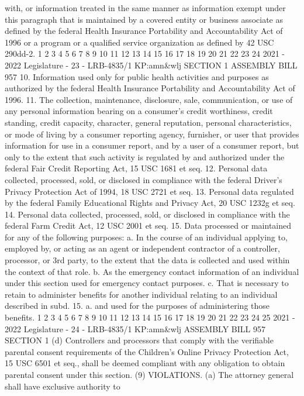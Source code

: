 with, or information treated in the same manner as information exempt under this
paragraph that is maintained by a covered entity or business associate as defined by
the federal Health Insurance Portability and Accountability Act of 1996 or a program
or a qualified service organization as defined by 42 USC 290dd-2.
1
2
3
4
5
6
7
8
9
10
11
12
13
14
15
16
17
18
19
20
21
22
23
24
2021 - 2022 Legislature - 23 - LRB-4835/1
KP:amn&wlj
SECTION 1 ASSEMBLY BILL 957
10. Information used only for public health activities and purposes as
authorized by the federal Health Insurance Portability and Accountability Act of
1996.
11. The collection, maintenance, disclosure, sale, communication, or use of any
personal information bearing on a consumer's credit worthiness, credit standing,
credit capacity, character, general reputation, personal characteristics, or mode of
living by a consumer reporting agency, furnisher, or user that provides information
for use in a consumer report, and by a user of a consumer report, but only to the extent
that such activity is regulated by and authorized under the federal Fair Credit
Reporting Act, 15 USC 1681 et seq.
12. Personal data collected, processed, sold, or disclosed in compliance with the
federal Driver's Privacy Protection Act of 1994, 18 USC 2721 et seq.
13. Personal data regulated by the federal Family Educational Rights and
Privacy Act, 20 USC 1232g et seq.
14. Personal data collected, processed, sold, or disclosed in compliance with the
federal Farm Credit Act, 12 USC 2001 et seq.
15. Data processed or maintained for any of the following purposes:
a. In the course of an individual applying to, employed by, or acting as an agent
or independent contractor of a controller, processor, or 3rd party, to the extent that
the data is collected and used within the context of that role.
b. As the emergency contact information of an individual under this section
used for emergency contact purposes.
c. That is necessary to retain to administer benefits for another individual
relating to an individual described in subd. 15. a. and used for the purposes of
administering those benefits.
1
2
3
4
5
6
7
8
9
10
11
12
13
14
15
16
17
18
19
20
21
22
23
24
25
2021 - 2022 Legislature - 24 - LRB-4835/1
KP:amn&wlj
 ASSEMBLY BILL 957 SECTION 1
(d) Controllers and processors that comply with the verifiable parental consent
requirements of the Children's Online Privacy Protection Act, 15 USC 6501 et seq.,
shall be deemed compliant with any obligation to obtain parental consent under this
section.
(9) VIOLATIONS. (a) The attorney general shall have exclusive authority to
